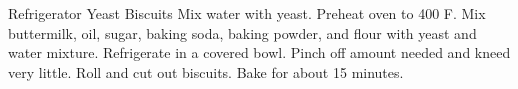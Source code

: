 \documentclass[../main.tex]{subfiles}
\begin{document}
\begin{recipe}{Refrigerator Yeast Biscuits}{}{}
    Mix water with yeast.
    Preheat oven to 400\degrees{} F. Mix buttermilk, oil, sugar, baking
    soda, baking powder, and flour with yeast and water mixture.
    Refrigerate in a covered bowl. Pinch off amount needed and kneed
    very little. Roll and cut out biscuits. Bake for about 15 minutes.
\end{recipe}
\end{document}
